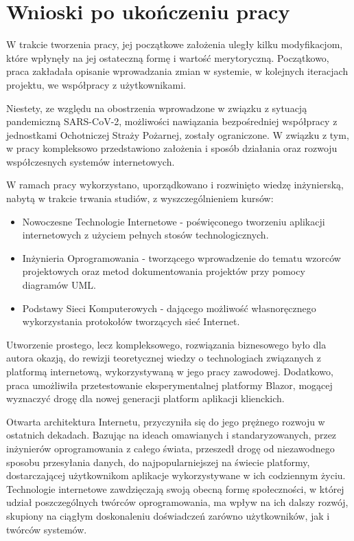\section{Wnioski po ukończeniu pracy}

W trakcie tworzenia pracy, jej początkowe założenia uległy kilku modyfikacjom, które wpłynęły na jej ostateczną formę i wartość merytoryczną. Początkowo, praca zakładała opisanie wprowadzania zmian w systemie, w kolejnych iteracjach projektu, we współpracy z użytkownikami.

Niestety, ze względu na obostrzenia wprowadzone w związku z sytuacją pandemiczną SARS-CoV-2, możliwości nawiązania bezpośredniej współpracy z jednostkami Ochotniczej Straży Pożarnej, zostały ograniczone. W związku z tym, w pracy kompleksowo przedstawiono założenia i sposób działania oraz rozwoju współczesnych systemów internetowych.

W ramach pracy wykorzystano, uporządkowano i rozwinięto wiedzę inżynierską, nabytą w trakcie trwania studiów, z wyszczególnieniem kursów:

\begin{itemize}
    \item Nowoczesne Technologie Internetowe - poświęconego tworzeniu aplikacji internetowych z użyciem pełnych stosów technologicznych.
    \item Inżynieria Oprogramowania - tworzącego wprowadzenie do tematu wzorców projektowych oraz metod dokumentowania projektów przy pomocy diagramów UML.
    \item Podstawy Sieci Komputerowych - dającego możliwość własnoręcznego wykorzystania protokołów tworzących sieć Internet.
\end{itemize}

Utworzenie prostego, lecz kompleksowego, rozwiązania biznesowego było dla autora okazją, do rewizji teoretycznej wiedzy o technologiach związanych z platformą internetową, wykorzystywaną w jego pracy zawodowej. Dodatkowo, praca umożliwiła przetestowanie eksperymentalnej platformy Blazor, mogącej wyznaczyć drogę dla nowej generacji platform aplikacji klienckich. 

Otwarta architektura Internetu, przyczyniła się do jego prężnego rozwoju w ostatnich dekadach. Bazując na ideach omawianych i standaryzowanych, przez inżynierów oprogramowania z całego świata, przeszedł drogę od niezawodnego sposobu przesyłania danych, do najpopularniejszej na świecie platformy, dostarczającej użytkownikom aplikacje wykorzystywane w ich codziennym życiu. Technologie internetowe zawdzięczają swoją obecną formę społeczności, w której udział poszczególnych twórców oprogramowania, ma wpływ na ich dalszy rozwój, skupiony na ciągłym doskonaleniu doświadczeń zarówno użytkowników, jak i twórców systemów. %

